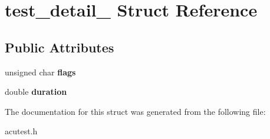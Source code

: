 \hypertarget{structtest__detail__}{}\section{test\+\_\+detail\+\_\+ Struct Reference}
\label{structtest__detail__}
\subsection*{Public Attributes}
\begin{DoxyCompactItemize}
\item 
unsigned char {\bfseries flags}\hypertarget{structtest__detail___ab25c5b8b3505712d3e821103d992ab82}{}\label{structtest__detail___ab25c5b8b3505712d3e821103d992ab82}

\item 
double {\bfseries duration}\hypertarget{structtest__detail___a39cddb6e2a4f3067066354bd71307e59}{}\label{structtest__detail___a39cddb6e2a4f3067066354bd71307e59}

\end{DoxyCompactItemize}


The documentation for this struct was generated from the following file\+:\begin{DoxyCompactItemize}
\item 
acutest.\+h\end{DoxyCompactItemize}
